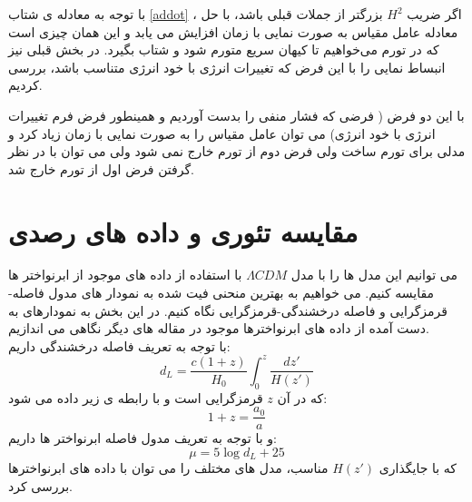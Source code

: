 \documentclass[12pt]{article}
\begin{document}
با توجه به معادله ی شتاب
\eqref{addot}
 ، اگر ضریب $H^2$ بزرگتر از جملات قبلی باشد، با حل معادله عامل مقیاس به صورت نمایی با زمان افزایش می یابد و این همان چیزی است 
که در تورم می‌خواهیم تا کیهان سریع متورم شود و شتاب بگیرد.
 در بخش قبلی نیز انبساط نمایی را با این فرض که تغییرات انرژی با خود انرژی متناسب باشد، بررسی کردیم.

با این دو فرض ( فرضی که فشار منفی را بدست آوردیم و همینطور فرض فرم تغییرات انرژی با خود انرژی) می توان عامل مقیاس را به صورت نمایی با زمان زیاد کرد و 
مدلی برای تورم ساخت ولی فرض دوم از تورم خارج نمی شود ولی می توان با در نظر گرفتن فرض اول از تورم خارج شد.
\pagebreak
\section{مقایسه تئوری و داده های رصدی}
می توانیم این مدل ها را با مدل $\Lambda CDM$ با استفاده از داده های موجود از ابرنواختر ها مقایسه کنیم. می خواهیم به
 بهترین منحنی فیت شده به نمودار های مدول فاصله-قرمزگرایی و فاصله درخشندگی-قرمزگرایی نگاه کنیم.
 در این بخش به نمودارهای به دست آمده از داده های ابرنواخترها موجود در مقاله های دیگر نگاهی می اندازیم. \\
با توجه به تعریف فاصله درخشندگی داریم:
\begin{equation}
d_L=\frac{c(1+z)}{H_0}\int_{0}^{z}\frac{dz'}{H(z')}
\end{equation}
که در آن $z$ قرمزگرایی است و با رابطه ی زیر داده می شود:
$$1+z=\frac{a_0}{a}$$
و با توجه به تعریف مدول فاصله ابرنواختر ها داریم:
\begin{equation}
\mu = 5\log{d_L}+25
\end{equation}
که با جایگذاری $H(z')$ مناسب، مدل های مختلف را می توان با داده های ابرنواخترها بررسی کرد.
\end{document}
